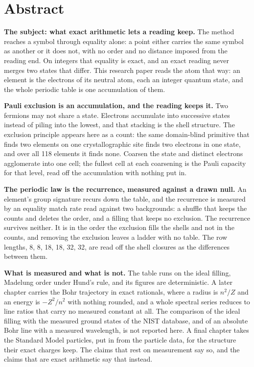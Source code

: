 \chapter*{Abstract}

\textbf{The subject: what exact arithmetic lets a reading keep.} The method reaches a symbol through
equality alone: a point either carries the same symbol as another or it does not, with no order and
no distance imposed from the reading end. On integers that equality is exact, and an exact reading
never merges two states that differ. This research paper reads the atom that way: an element is the
electrons of its neutral atom, each an integer quantum state, and the whole periodic table is one
accumulation of them.

\textbf{Pauli exclusion is an accumulation, and the reading keeps it.} Two fermions may not share a
state. Electrons accumulate into successive states instead of piling into the lowest, and that
stacking is the shell structure. The exclusion principle appears here as a count: the same
domain-blind primitive that finds two elements on one crystallographic site finds two electrons in
one state, and over all 118 elements it finds none. Coarsen the state and distinct electrons
agglomerate into one cell; the fullest cell at each coarsening is the Pauli capacity for that level,
read off the accumulation with nothing put in.

\textbf{The periodic law is the recurrence, measured against a drawn null.} An element's group
signature recurs down the table, and the recurrence is measured by an equality match rate read
against two backgrounds: a shuffle that keeps the counts and deletes the order, and a filling that
keeps no exclusion. The recurrence survives neither. It is in the order the exclusion fills the
shells and not in the counts, and removing the exclusion leaves a ladder with no table. The row
lengths, 8, 8, 18, 18, 32, 32, are read off the shell closures as the differences between them.

\textbf{What is measured and what is not.} The table runs on the ideal filling, Madelung order under
Hund's rule, and its figures are deterministic. A later chapter carries the Bohr trajectory in exact
rationals, where a radius is $n^2/Z$ and an energy is $-Z^2/n^2$ with nothing rounded, and a whole
spectral series reduces to line ratios that carry no measured constant at all. The comparison of the
ideal filling with the measured ground states of the NIST database, and of an absolute Bohr line with
a measured wavelength, is not reported here. A final chapter takes the Standard Model particles, put
in from the particle data, for the structure their exact charges keep. The claims that rest on
measurement say so, and the claims that are exact arithmetic say that instead.
